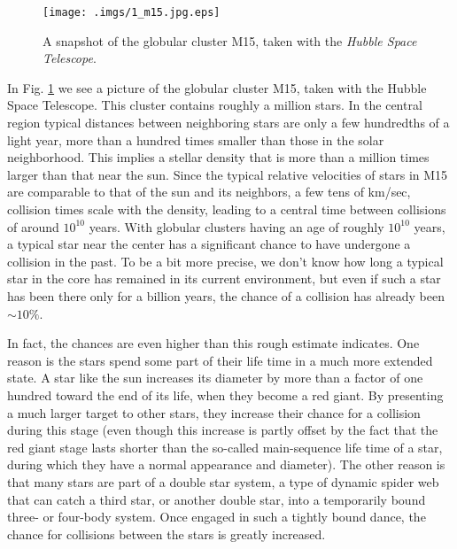 \documentclass{book}
\begin{document}
 
\begin{figure}
\renewcommand{\thefootnote}{\fnsymbol{footnote}}
\renewcommand{\thempfootnote}{\fnsymbol{mpfootnote}}
\begin{minipage}{\columnwidth}
\begin{minipage}{\columnwidth}
\begin{center}
\renewcommand{\thefootnote}{\fnsymbol{footnote}}
    \texttt{[image: .imgs/1\_m15.jpg.eps]}
\caption{A snapshot of the globular cluster M15, taken with the
 {\it Hubble Space Telescope\protect \footnotemark[1]}.
}

\label{m15}
\end{center}
\renewcommand{\thefootnote}{\arabic{footnote}}
\end{minipage}
\renewcommand{\thefootnote}{\fnsymbol{footnote}}


\end{minipage}
\end{figure}


 


In Fig. \ref{m15} we see a
picture of the globular cluster M15, taken with the Hubble Space
Telescope.  This cluster contains roughly a million stars.  In the
central region typical distances between neighboring stars are only a
few hundredths of a light year, more than a hundred times smaller than
those in the solar neighborhood.  This implies a stellar density that
is more than a million times larger than that near the sun.  Since the
typical relative velocities of stars in M15 are comparable to that of
the sun and its neighbors, a few tens of km/sec, collision times scale
with the density, leading to a central time between collisions of around
 $10^{10}$ years.  With globular clusters having an age of
roughly  $10^{10}$ years, a typical star near the center has
a significant chance to have undergone a collision in the past.  To be
a bit more precise, we don't know how long a typical star in the core
has remained in its current environment, but even if such a star has
been there only for a billion years, the chance of a collision has
already been  $\sim10\%$.

In fact, the chances are even higher than this rough estimate indicates.
One reason is the stars spend some part of their life time in a much
more extended state.  A star like the sun increases its diameter by
more than a factor of one hundred toward the end of its life, when
they become a red giant.  By presenting a much larger target to other
stars, they increase their chance for a collision during this stage
(even though this increase is partly offset by the fact that the red
giant stage lasts shorter than the so-called main-sequence life time
of a star, during which they have a normal appearance and diameter).
The other reason is that many stars are part of a double star system,
a type of dynamic spider web that can catch a third star, or another
double star, into a temporarily bound three- or four-body system.
Once engaged in such a tightly bound dance, the chance for collisions
between the stars is greatly increased.
\end{document}
